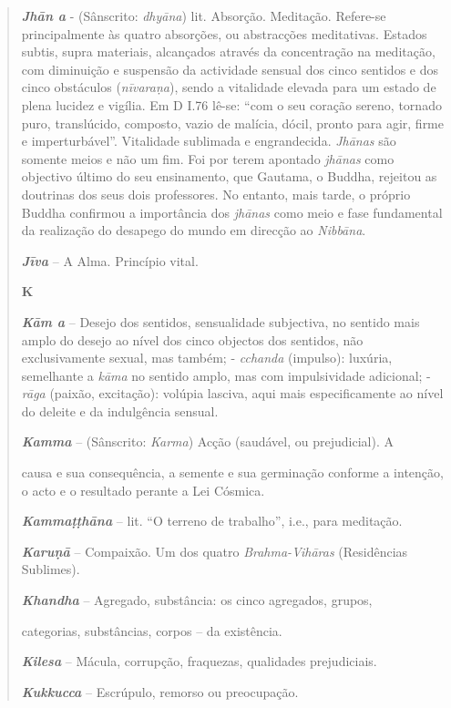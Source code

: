\begin{quote}
\emph{\textbf{Jhān a}} - (Sânscrito: \emph{dhyāna}) lit. Absorção. Meditação. Refere-se principalmente às quatro absorções, ou abstracções meditativas. Estados subtis, supra materiais, alcançados através da concentração na meditação, com diminuição e suspensão da actividade sensual dos cinco sentidos e dos cinco obstáculos (\emph{nīvaraṇa}), sendo a vitalidade elevada para um estado de plena lucidez e vigília. Em D I.76 lê-se: ``com o seu coração sereno, tornado puro, translúcido, composto, vazio de malícia, dócil, pronto para agir, firme e imperturbável''. Vitalidade sublimada e engrandecida. \emph{Jhānas} são somente meios e não um fim. Foi por terem apontado \emph{jhānas} como objectivo último do seu ensinamento, que Gautama, o Buddha, rejeitou as doutrinas dos seus dois professores. No entanto, mais tarde, o próprio Buddha confirmou a importância dos \emph{jhānas} como meio e fase fundamental da realização do desapego do mundo em direcção ao \emph{Nibbāna}.

\emph{\textbf{Jīva}} -- A Alma. Princípio vital.

\textbf{K}

\emph{\textbf{Kām a}} -- Desejo dos sentidos, sensualidade subjectiva, no sentido mais amplo do desejo ao nível dos cinco objectos dos sentidos, não exclusivamente sexual, mas também; - \emph{cchanda} (impulso): luxúria, semelhante a \emph{kāma} no sentido amplo, mas com impulsividade adicional; - \emph{rāga} (paixão, excitação): volúpia lasciva, aqui mais especificamente ao nível do deleite e da indulgência sensual.

\emph{\textbf{Kamma}} -- (Sânscrito: \emph{Karma}) Acção (saudável, ou prejudicial). A

causa e sua consequência, a semente e sua germinação conforme a intenção, o acto e o resultado perante a Lei Cósmica.

\emph{\textbf{Kammaṭṭhāna}} -- lit. ``O terreno de trabalho'', i.e., para meditação.

\emph{\textbf{Karuṇā}} -- Compaixão. Um dos quatro \emph{Brahma-Vihāras} (Residências Sublimes).

\emph{\textbf{Khandha}} -- Agregado, substância: os cinco agregados, grupos,

categorias, substâncias, corpos -- da existência.

\emph{\textbf{Kilesa}} -- Mácula, corrupção, fraquezas, qualidades prejudiciais.

\emph{\textbf{Kukkucca}} -- Escrúpulo, remorso ou preocupação.


\end{quote}
